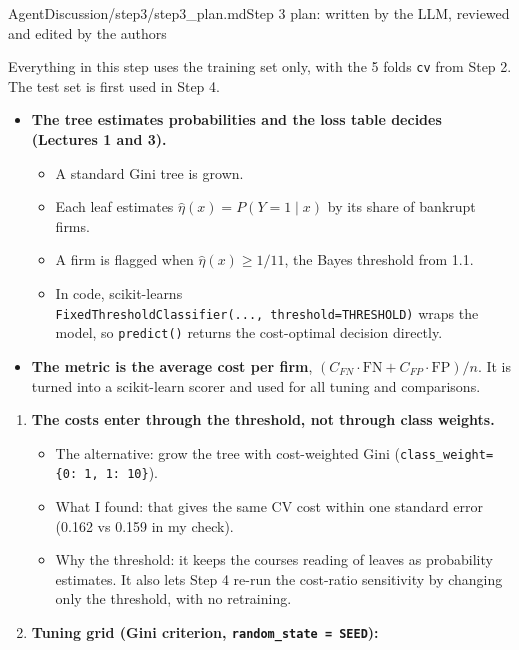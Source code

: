 \begin{mdfile}{AgentDiscussion/\allowbreak{}step3/\allowbreak{}step3\_plan.md}{Step 3 plan: written by the LLM, reviewed and edited by the authors}

Everything in this step uses the training set only, with the 5 folds \texttt{cv} from Step 2. The test set is first used in Step 4.


\begin{itemize}
\tightlist
\item
  \textbf{The tree estimates probabilities and the loss table decides (Lectures 1 and 3).}

  \begin{itemize}
  \tightlist
  \item
    A standard Gini tree is grown.
  \item
    Each leaf estimates \(\hat\eta(x) = P(Y=1 \mid x)\) by its share of bankrupt firms.
  \item
    A firm is flagged when \(\hat\eta(x) \geq 1/11\), the Bayes threshold from 1.1.
  \item
    In code, scikit-learn\textquotesingle s \texttt{FixedThresholdClassifier(...,\ threshold=THRESHOLD)} wraps the model, so \texttt{predict()} returns the cost-optimal decision directly.
  \end{itemize}
\item
  \textbf{The metric is the average cost per firm}, \((C_{FN}\cdot\text{FN} + C_{FP}\cdot\text{FP})/n\). It is turned into a scikit-learn scorer and used for all tuning and comparisons.
\end{itemize}


\begin{enumerate}
\def\labelenumi{\arabic{enumi}.}
\item
  \textbf{The costs enter through the threshold, not through class weights.}

  \begin{itemize}
  \tightlist
  \item
    The alternative: grow the tree with cost-weighted Gini (\texttt{class\_weight=\{0:\ 1,\ 1:\ 10\}}).
  \item
    What I found: that gives the same CV cost within one standard error (0.162 vs 0.159 in my check).
  \item
    Why the threshold: it keeps the course\textquotesingle s reading of leaves as probability estimates. It also lets Step 4 re-run the cost-ratio sensitivity by changing only the threshold, with no retraining.
  \end{itemize}
\item
  \textbf{Tuning grid (Gini criterion, \texttt{random\_state\ =\ SEED}):}


\end{enumerate}
\end{mdfile}
